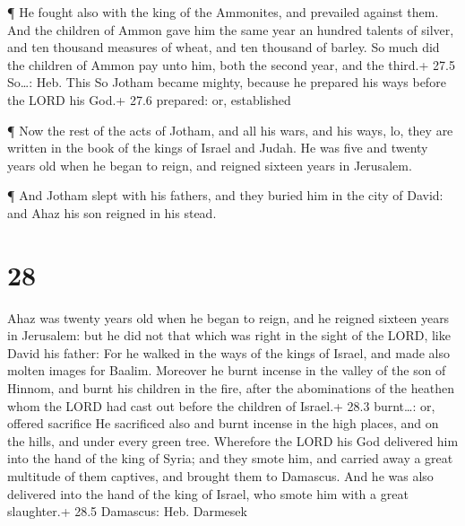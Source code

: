  ¶ He fought also with the king of the Ammonites, and
prevailed against them. And the children of Ammon gave him the same year
an hundred talents of silver, and ten thousand measures of wheat, and
ten thousand of barley. So much did the children of Ammon pay unto him,
both the second year, and the third.+ 27.5 So\ldots: Heb. This
 So Jotham became mighty, because he prepared his ways
before the LORD his God.+ 27.6 prepared: or, established

 ¶ Now the rest of the acts of Jotham, and all his wars, and
his ways, lo, they are written in the book of the kings of Israel and
Judah.  He was five and twenty years old when he began to
reign, and reigned sixteen years in Jerusalem.

 ¶ And Jotham slept with his fathers, and they buried him in
the city of David: and Ahaz his son reigned in his stead.

\hypertarget{section-27}{%
\section{28}\label{section-27}}

 Ahaz was twenty years old when he began to reign, and he
reigned sixteen years in Jerusalem: but he did not that which was right
in the sight of the LORD, like David his father:  For he
walked in the ways of the kings of Israel, and made also molten images
for Baalim.  Moreover he burnt incense in the valley of the
son of Hinnom, and burnt his children in the fire, after the
abominations of the heathen whom the LORD had cast out before the
children of Israel.+ 28.3 burnt\ldots: or, offered sacrifice
 He sacrificed also and burnt incense in the high places,
and on the hills, and under every green tree.  Wherefore the
LORD his God delivered him into the hand of the king of Syria; and they
smote him, and carried away a great multitude of them captives, and
brought them to Damascus. And he was also delivered into the hand of the
king of Israel, who smote him with a great slaughter.+ 28.5 Damascus:
Heb. Darmesek

